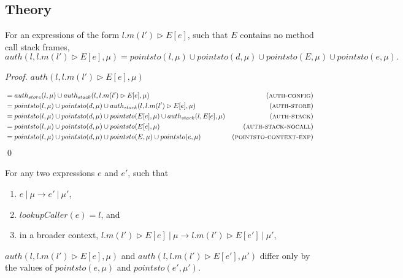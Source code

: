 \documentclass{llncs}
\begin{document}
\newpage

\subsection{Theory}

\begin{lemma}
For an expressions of the form $l.m(l') \rhd E[e]$, such that $E$ contains no method call stack frames,
\[
auth(l, l.m(l') \rhd E[e], \mu) = pointsto(l, \mu) \cup pointsto(d, \mu) \cup pointsto(E, \mu) \cup pointsto(e, \mu).
\]
\end{lemma}

\begin{proof} $auth(l, l.m(l') \rhd E[e], \mu)$

\vspace{-17pt}

\begin{align*}
&= auth_{store}(l, \mu) \cup auth_{stack}(l, l.m(l') \rhd E[e], \mu) & (\textsc{auth-config})\\
&= pointsto(l, \mu) \cup pointsto(d, \mu) \cup auth_{stack}(l, l.m(l') \rhd E[e], \mu) & (\textsc{auth-store})\\
&= pointsto(l, \mu) \cup pointsto(d, \mu) \cup pointsto(E[e], \mu) \cup auth_{stack}(l, E[e], \mu) & (\textsc{auth-stack})\\
&= pointsto(l, \mu) \cup pointsto(d, \mu) \cup pointsto(E[e], \mu) & (\textsc{auth-stack-nocall})\\
&= pointsto(l, \mu) \cup pointsto(d, \mu) \cup pointsto(E, \mu) \cup pointsto(e, \mu) & (\textsc{pointsto-context-exp})
\end{align*}\qed

\end{proof}


\begin{lemma}
For any two expressions $e$ and $e'$, such that
\begin{enumerate}
\item $e~|~\mu \longrightarrow e'~|~\mu'$,
\item $lookupCaller(e) = l$, and
\item in a broader context, $l.m(l') \rhd E[e]~|~\mu \longrightarrow l.m(l') \rhd E[e']~|~\mu'$,
\end{enumerate}
$auth(l, l.m(l') \rhd E[e], \mu)$ and $auth(l, l.m(l') \rhd E[e'], \mu')$ differ only by the values of $pointsto(e, \mu)$ and $pointsto(e', \mu')$.
\end{lemma}
\end{document}
